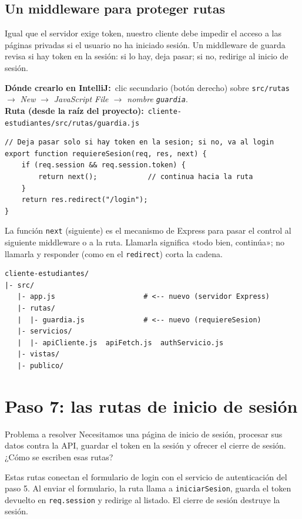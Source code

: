 \documentclass[11pt]{article}
\newcommand{\dondecrear}[3]{\begin{ubic}{\footnotesize\textbf{\color{ndverdeo}D\'onde crearlo en IntelliJ:}~clic secundario (bot\'on derecho) sobre \texttt{#1} $\rightarrow$ \emph{New} $\rightarrow$ \emph{#2}.\\[2pt]\textbf{\color{ndverdeo}Ruta (desde la ra\'iz del proyecto):}~\texttt{#3}}\end{ubic}\nobreak\vspace{3pt}}
\begin{document}
\subsection{Un middleware para proteger rutas}
Igual que el servidor exige token, nuestro cliente debe impedir el acceso a las páginas privadas si el usuario no ha iniciado sesión. Un middleware de guarda revisa si hay token en la sesión: si lo hay, deja pasar; si no, redirige al inicio de sesión.

\dondecrear{src/rutas}{JavaScript File $\rightarrow$ nombre \texttt{guardia}}{cliente-estudiantes/src/rutas/guardia.js}
\begin{cajacodigo}
\begin{lstlisting}[style=js]
// Deja pasar solo si hay token en la sesion; si no, va al login
export function requiereSesion(req, res, next) {
	if (req.session && req.session.token) {
		return next();            // continua hacia la ruta
	}
	return res.redirect("/login");
}
\end{lstlisting}
\end{cajacodigo}
\vspace{2pt}
La función \texttt{next} (siguiente) es el mecanismo de Express para pasar el control al siguiente middleware o a la ruta. Llamarla significa «todo bien, continúa»; no llamarla y responder (como en el \texttt{redirect}) corta la cadena.

\begin{cajacodigo}
\begin{lstlisting}[style=markup]
cliente-estudiantes/
|- src/
   |- app.js                     # <-- nuevo (servidor Express)
   |- rutas/
   |  |- guardia.js              # <-- nuevo (requiereSesion)
   |- servicios/
   |  |- apiCliente.js  apiFetch.js  authServicio.js
   |- vistas/
   |- publico/
\end{lstlisting}
\end{cajacodigo}
\vspace{2pt}

\section{Paso 7: las rutas de inicio de sesión}
\begin{cajaproblema}{Problema a resolver}
Necesitamos una página de inicio de sesión, procesar sus datos contra la API, guardar el token en la sesión y ofrecer el cierre de sesión. ¿Cómo se escriben esas rutas?\par
\end{cajaproblema}
Estas rutas conectan el formulario de login con el servicio de autenticación del paso 5. Al enviar el formulario, la ruta llama a \texttt{iniciar\allowbreak{}Sesion}, guarda el token devuelto en \texttt{req.\allowbreak{}session} y redirige al listado. El cierre de sesión destruye la sesión.
\end{document}
